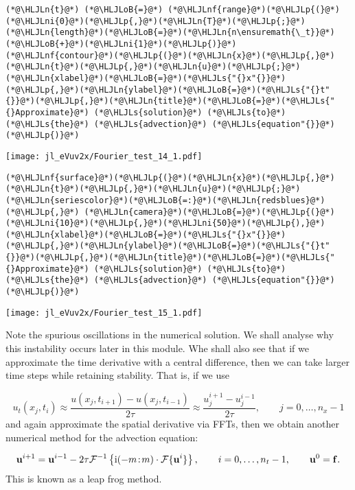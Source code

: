 \documentclass[12pt,a4paper]{article}
\newcommand{\HLJLn}[1]{#1}
\newcommand{\HLJLnf}[1]{\textcolor[RGB]{66,102,213}{#1}}
\newcommand{\HLJLs}[1]{\textcolor[RGB]{201,61,57}{#1}}
\newcommand{\HLJLni}[1]{\textcolor[RGB]{59,151,46}{#1}}
\newcommand{\HLJLoB}[1]{\textcolor[RGB]{102,102,102}{\textbf{#1}}}
\newcommand{\HLJLp}[1]{#1}
\begin{document}
\begin{lstlisting}
(*@\HLJLn{t}@*) (*@\HLJLoB{=}@*) (*@\HLJLnf{range}@*)(*@\HLJLp{(}@*)(*@\HLJLni{0}@*)(*@\HLJLp{,}@*)(*@\HLJLn{T}@*)(*@\HLJLp{;}@*)(*@\HLJLn{length}@*)(*@\HLJLoB{=}@*)(*@\HLJLn{n\ensuremath{\_t}}@*)(*@\HLJLoB{+}@*)(*@\HLJLni{1}@*)(*@\HLJLp{)}@*)
(*@\HLJLnf{contour}@*)(*@\HLJLp{(}@*)(*@\HLJLn{x}@*)(*@\HLJLp{,}@*)(*@\HLJLn{t}@*)(*@\HLJLp{,}@*)(*@\HLJLn{u}@*)(*@\HLJLp{;}@*)(*@\HLJLn{xlabel}@*)(*@\HLJLoB{=}@*)(*@\HLJLs{"{}x"{}}@*)(*@\HLJLp{,}@*)(*@\HLJLn{ylabel}@*)(*@\HLJLoB{=}@*)(*@\HLJLs{"{}t"{}}@*)(*@\HLJLp{,}@*)(*@\HLJLn{title}@*)(*@\HLJLoB{=}@*)(*@\HLJLs{"{}Approximate}@*) (*@\HLJLs{solution}@*) (*@\HLJLs{to}@*) (*@\HLJLs{the}@*) (*@\HLJLs{advection}@*) (*@\HLJLs{equation"{}}@*)(*@\HLJLp{)}@*)
\end{lstlisting}

\texttt{[image: jl\_eVuv2x/Fourier\_test\_14\_1.pdf]}

\begin{lstlisting}
(*@\HLJLnf{surface}@*)(*@\HLJLp{(}@*)(*@\HLJLn{x}@*)(*@\HLJLp{,}@*)(*@\HLJLn{t}@*)(*@\HLJLp{,}@*)(*@\HLJLn{u}@*)(*@\HLJLp{;}@*)(*@\HLJLn{seriescolor}@*)(*@\HLJLoB{=:}@*)(*@\HLJLn{redsblues}@*)(*@\HLJLp{,}@*) (*@\HLJLn{camera}@*)(*@\HLJLoB{=}@*)(*@\HLJLp{(}@*)(*@\HLJLni{10}@*)(*@\HLJLp{,}@*)(*@\HLJLni{50}@*)(*@\HLJLp{),}@*)
(*@\HLJLn{xlabel}@*)(*@\HLJLoB{=}@*)(*@\HLJLs{"{}x"{}}@*)(*@\HLJLp{,}@*)(*@\HLJLn{ylabel}@*)(*@\HLJLoB{=}@*)(*@\HLJLs{"{}t"{}}@*)(*@\HLJLp{,}@*)(*@\HLJLn{title}@*)(*@\HLJLoB{=}@*)(*@\HLJLs{"{}Approximate}@*) (*@\HLJLs{solution}@*) (*@\HLJLs{to}@*) (*@\HLJLs{the}@*) (*@\HLJLs{advection}@*) (*@\HLJLs{equation"{}}@*)(*@\HLJLp{)}@*)
\end{lstlisting}

\texttt{[image: jl\_eVuv2x/Fourier\_test\_15\_1.pdf]}

Note the spurious oscillations in the numerical solution.  We shall analyse why this instability occurs later in this module.  Whe shall also see that if we approximate the time derivative with a central difference, then we can take larger time steps while retaining stability. That is, if we use

\[
u_t(x_j,t_i) \approx \frac{u(x_j,t_{i+1}) - u(x_j,t_{i-1})}{2\tau} \approx \frac{u^{i+1}_j - u^{i-1}_j}{2\tau}, \qquad j = 0, \ldots, n_x-1
\]
and again approximate the spatial derivative via FFTs, then we obtain another numerical method for the advection equation:

\[
\mathbf{u}^{i+1} = \mathbf{u}^{i-1} - 2\tau \mathcal{F}^{-1}\left\lbrace {\rm i}(-m\!:\!m)\cdot\mathcal{F}\lbrace \mathbf{u}^{i} \rbrace\right\rbrace, \qquad i = 0, \ldots, n_t-1, \qquad \mathbf{u}^0 = \mathbf{f}.
\]
This is known as a leap frog method.
\end{document}
